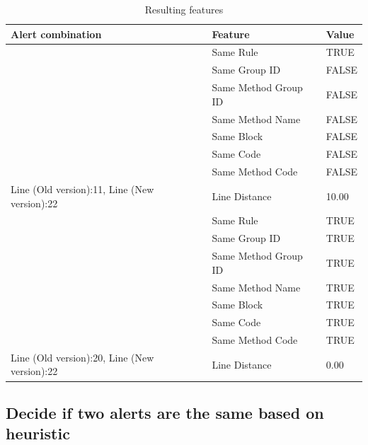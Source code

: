 \documentclass[
]{article}
\begin{document}
\begin{table}[H]

\caption{\label{tab:unnamed-chunk-13}Resulting features\label{table_features} }
\centering
\begin{tabular}[t]{l|l|l}
\hline
Alert combination & Feature & Value\\
\hline
\rowcolor{gray!6}  \rowcolor{gray!6}   & Same Rule & TRUE\\

 & Same Group ID & FALSE\\

\rowcolor{gray!6}   & Same Method Group ID & FALSE\\

 & Same Method Name & FALSE\\

\rowcolor{gray!6}   & Same Block & FALSE\\

 & Same Code & FALSE\\

\rowcolor{gray!6}   & Same Method Code & FALSE\\

\multirow[t]{-8}{*}{\raggedright\arraybackslash Line (Old version):11, Line (New version):22} & Line Distance & 10.00\\
\cline{1-3}
 & Same Rule & TRUE\\

 & Same Group ID & TRUE\\

\rowcolor{gray!6}   & Same Method Group ID & TRUE\\

 & Same Method Name & TRUE\\

\rowcolor{gray!6}   & Same Block & TRUE\\

 & Same Code & TRUE\\

\rowcolor{gray!6}   & Same Method Code & TRUE\\

\multirow[t]{-8}{*}{\raggedright\arraybackslash Line (Old version):20, Line (New version):22} & Line Distance & 0.00\\
\hline
\end{tabular}
\end{table}

\normalsize

\subsection{Decide if two alerts are the same based on heuristic}\label{heuristic}
\end{document}
